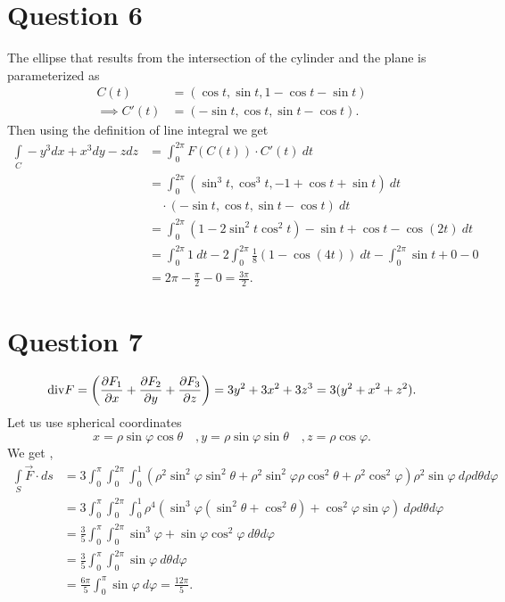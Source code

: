\documentclass[
	12pt,
	]{article}
\theoremstyle{definition}
\theoremstyle{definition}
\theoremstyle{definition}
\theoremstyle{definition}
\theoremstyle{definition}
\theoremstyle{example}
\theoremstyle{note}
\theoremstyle{remark}
\theoremstyle{example}
\begin{document}
 			\section*{Question 6}
 				The ellipse that results from the intersection of the cylinder and the plane is parameterized as
 				\begin{align*}
 				C(t) &= (\cos t, \sin t, 1-\cos t - \sin t) \\
 				\implies C'(t) &= (-\sin t, \cos t, \sin t - \cos t).
 				\end{align*}
 				Then using the definition of line integral we get 
 				\begin{align*}
 				\int\limits_{C} -y^3 dx + x^3 dy - zdz &= \int_{0}^{2\pi} F(C(t)) \cdot C'(t) \ dt \\
 				&= \int_{0}^{2\pi}(\sin^{3}t , \cos^{3}t, -1+\cos t + \sin t) \ dt \\
 				&\quad \cdot (-\sin t, \cos t , \sin t - \cos t) \ dt \\
 				&= \int_{0}^{2\pi} (1-2\sin^{2} t \cos^{2} t)-\sin t+\cos t -  \cos(2t) \ d t\\
 				&=\int_{0}^{2\pi} 1 \ dt  - 2\int_{0}^{2\pi}\frac18 (1-\cos(4t)) \ dt - \int_{0}^{2\pi} \sin t +0 - 0\\
 				&= 2\pi - \frac{\pi}{2} -0 = \frac{3\pi}{2}.
 				\end{align*}
 			\section*{Question 7}
 				$$ \text{div} F = \left(\pdv{F_{1}}{x} + \pdv{F_{2}}{y} + \pdv{F_{3}}{z}\right) = 3y^{2} + 3x^{2} + 3z^{3} = 3(y^{2} + x^{2} +z^{2}).$$
 				Let us use spherical coordinates 
 				$$ x = \rho \sin \varphi \cos \theta \quad, y = \rho\sin\varphi \sin\theta \quad, z = \rho\cos\varphi. $$
 				We get ,
 				\begin{align*}
 					\int\limits_{S} \vec{F} \cdot ds  &= 3 \int_{0}^{\pi}\int_{0}^{2\pi} \int_{0}^{1} (\rho^{2} \sin^{2}\varphi \sin^{2} \theta + \rho^{2} \sin^{2}\varphi \rho  \cos^{2}\theta + \rho^{2} \cos^{2} \varphi ) \rho^{2} \sin\varphi \ d\rho d\theta d\varphi \\
 					&= 3 \int_{0}^{\pi}\int_{0}^{2\pi} \int_{0}^{1} \rho^{4} (\sin^{3} \varphi (\sin^{2} \theta + \cos^{2}\theta) + \cos^{2}\varphi \sin\varphi) \ d\rho d\theta d\varphi \\
 					&= \frac35 \int_{0}^{\pi} \int_{0}^{2\pi} \sin^{3}\varphi  + \sin\varphi \cos^{2}\varphi \ d\theta d\varphi \\
 					&= \frac35 \int_{0}^{\pi} \int_{0}^{2\pi} \sin\varphi \ d\theta d\varphi \\
 					&= \frac{6\pi}{5} \int_{0}^{\pi} \sin\varphi \ d\varphi = \frac{12\pi}{5}.
 				\end{align*}
	
\end{document}
